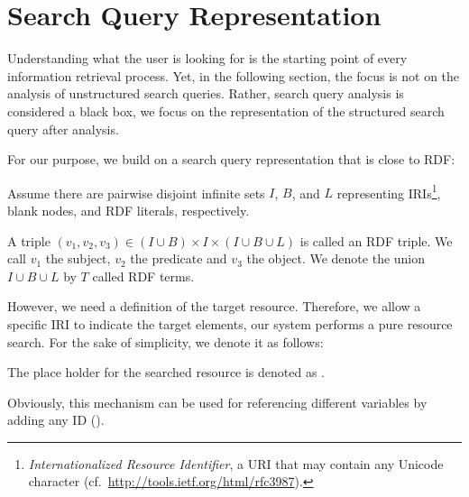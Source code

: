 \section{Search Query Representation}\label{chafedsearch:sec:searchqueryanalysis}

Understanding what the user is looking for is the starting point of every information retrieval process.
Yet, in the following section, the focus is not on the analysis of unstructured search queries.
Rather, search query analysis is considered a black box, \ie we focus on the representation of the structured search query after analysis.

For our purpose, we build on a search query representation that is close to RDF:
\begin{definition}
Assume there are pairwise disjoint infinite sets $I$, $B$, and $L$ representing IRIs\footnote{\textit{Internationalized Resource Identifier}, \ie a URI that may contain any Unicode character (cf.~\url{http://tools.ietf.org/html/rfc3987}).}, blank nodes, and RDF literals, respectively. 

A triple $(v_1, v_2, v_3) \in (I \cup B) \times I \times (I \cup B \cup L)$ is called an RDF triple. 
We call $v_1$ the subject, $v_2$ the predicate and $v_3$ the object. 
We denote the union $I \cup B \cup L$ by $T$ called RDF terms.
\end{definition}

However, we need a definition of the target resource.
Therefore, we allow a specific IRI to indicate the target elements, \ie our system performs a pure resource search.
For the sake of simplicity, we denote it as follows:


\begin{definition}
The place hold\-er for the searched resource is denoted as \placeholder.  
\end{definition}


Obviously, this mechanism can be used for referencing different variables by adding any ID (\eg \placeholderB).

